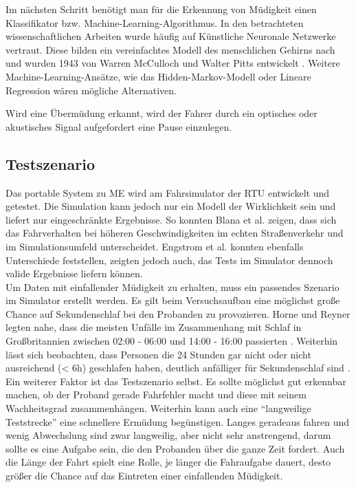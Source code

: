 {Im nächsten Schritt benötigt man für die Erkennung von Müdigkeit einen Klassifikator bzw. Machine-Learning-Algorithmus. In den betrachteten wissenschaftlichen Arbeiten wurde häufig auf Künstliche Neuronale Netzwerke vertraut. Diese bilden ein vereinfachtes Modell des menschlichen Gehirns nach und wurden 1943 von Warren McCulloch und Walter Pitts entwickelt \cite{ann}. Weitere Machine-Learning-Ansätze, wie das Hidden-Markov-Modell oder Lineare Regression wären mögliche Alternativen.

Wird eine Übermüdung erkannt, wird der Fahrer durch ein optisches oder akustisches Signal aufgefordert eine Pause einzulegen.

\subsection{Testszenario}
\label{sec:scene}
Das portable System zu \acl{ME} wird am Fahrsimulator der \acl{RTU} entwickelt und getestet. Die Simulation kann jedoch nur ein Modell der Wirklichkeit sein und liefert nur eingeschränkte Ergebnisse. So konnten Blana et al. \cite{Blana_1} zeigen, dass sich das Fahrverhalten bei höheren Geschwindigkeiten im echten Straßenverkehr und im Simulationsumfeld unterscheidet. Engstrom et al.  \cite{Engstrom_2322937} konnten ebenfalls Unterschiede feststellen, zeigten jedoch auch, das Tests im Simulator dennoch valide Ergebnisse liefern können. \\

Um Daten mit einfallender Müdigkeit zu erhalten, muss ein passendes Szenario im Simulator erstellt werden. Es gilt beim Versuchsaufbau eine möglichst große Chance auf Sekundenschlaf bei den Probanden zu provozieren. Horne und Reyner legten nahe, dass die meisten Unfälle im Zusammenhang mit Schlaf in Großbritannien zwischen 02:00 - 06:00 und 14:00 - 16:00 passierten \cite{Horne_1757738}. Weiterhin lässt sich beobachten, dass Personen die 24 Stunden gar nicht oder nicht ausreichend (< 6h) geschlafen haben, deutlich anfälliger für Sekundenschlaf sind \cite{Peters_1}. 
Ein weiterer Faktor ist das Testszenario selbst. Es sollte möglichst gut erkennbar machen, ob der Proband gerade Fahrfehler macht und diese mit seinem Wachheitsgrad zusammenhängen. Weiterhin kann auch eine "`langweilige Teststrecke"' eine schnellere Ermüdung begünstigen. Langes geradeaus fahren und wenig Abwechslung sind zwar langweilig, aber nicht sehr anstrengend, darum sollte es eine Aufgabe sein, die den Probanden über die ganze Zeit fordert. Auch die Länge der Fahrt spielt eine Rolle, je länger die Fahraufgabe dauert, desto größer die Chance auf das Eintreten einer einfallenden Müdigkeit. \\

}
